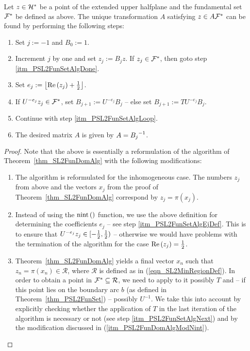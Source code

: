 \begin{theorem}
Let $z \in \mathcal{H}^\ast$ be a point of the extended upper halfplane and the fundamental set $\mathcal{F}^\ast$ be defined as above. The unique transformation $A$ satisfying $z \in A \mathcal{F}^\ast$ can be found by performing the following steps:
\begin{enumerate}
\item Set $j := -1$ and $B_0 := 1$.
\item \label{itm_PSL2FunSetAlgLoop}
Increment $j$ by one and set $z_j := B_j z$. If $z_j \in \mathcal{F}^\ast$, then goto step \ref{itm_PSL2FunSetAlgDone}.
\item \label{itm_PSL2FunSetAlgEjDef}
Set $e_j := \left\lfloor \operatorname{Re}\left(z_j\right) + \frac{1}{2} \right\rfloor$. 
\item \label{itm_PSL2FunSetAlgNext}
If $U^{-e_j} z_j \in \mathcal{F}^\ast$, set $B_{j+1} := U^{-e_j}B_j$ -- else set $B_{j+1} := TU^{-e_j}B_j$.
\item Continue with step \ref{itm_PSL2FunSetAlgLoop}.
\item \label{itm_PSL2FunSetAlgDone} 
The desired matrix $A$ is given by $A = {B_j}^{-1}$.
\end{enumerate}
\end{theorem}
\begin{proof}
Note that the above is essentially a reformulation of the algorithm of Theorem~\ref{thm_SL2FunDomAlg} with the following modifications:
\begin{enumerate}[\quad (a)]
\item The algorithm is reformulated for the inhomogeneous case. The numbers $z_j$ from above and the vectors $x_j$ from the proof of Theorem~\ref{thm_SL2FunDomAlg} correspond by $z_j = \pi(x_j)$.
\item \label{itm_PSL2FunDomAlgModNint}
Instead of using the $\operatorname{nint}\left(  \right)$ function, we use the above definition  for determining the coefficients $e_j$ -- see step \ref{itm_PSL2FunSetAlgEjDef}. This is to ensure that $U^{-e_j} z_j \in [-\frac{1}{2}, \frac{1}{2})$ -- otherwise we would have problems with the termination of the algorithm for the case $\operatorname{Re}\left(z_j\right) = \frac{1}{2}$.
\item Theorem~\ref{thm_SL2FunDomAlg} yields a final vector $x_n$ such that $z_n = \pi(x_n) \in \mathcal{R}$, where $\mathcal{R}$ is defined as in (\ref{eqn_SL2MinRegionDef}). In order to obtain a point in $\mathcal{F}^\ast \subseteq \mathcal{R}$, we need to apply to it possibly $T$ and -- if this point lies on the boundary arc $b$ (as defined in Theorem~\ref{thm_PSL2FunSet}) -- possibly $U^{-1}$. We take this into account by explicitly checking whether the application of $T$ in the last iteration of the algorithm is necessary or not (see step \ref{itm_PSL2FunSetAlgNext}) and by the modification discussed in (\ref{itm_PSL2FunDomAlgModNint}).\qedhere
\end{enumerate}
\end{proof}

